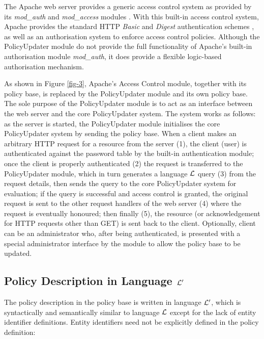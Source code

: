 \documentclass[global,twocolumn,final]{svjour}
\begin{document}

    The Apache web server provides a generic access control system as provided
    by its {\em mod\_auth} and {\em mod\_access} modules \cite{AP,LAU}. With
    this built-in access control system, Apache provides the standard HTTP
    {\em Basic} and {\em Digest} authentication schemes \cite{HTTP2}, as well
    as an authorisation system to enforce access control policies. Although the
    PolicyUpdater module do not provide the full functionality of Apache's
    built-in authorisation module {\em mod\_auth}, it does provide a flexible
    logic-based authorisation mechanism.

    As shown in Figure \ref{fig-3}, Apache's Access Control module, together
    with its policy base, is replaced by the PolicyUpdater module and its own
    policy base. The sole purpose of the PolicyUpdater module is to act as an
    interface between the web server and the core PolicyUpdater system. The
    system works as follows: as the server is started, the PolicyUpdater
    module initialises the core PolicyUpdater system by sending the policy
    base. When a client makes an arbitrary HTTP request for a resource from
    the server (1), the client (user) is authenticated against the password
    table by the built-in authentication module; once the client is properly
    authenticated (2) the request is transferred to the PolicyUpdater module,
    which in turn generates a language ${\cal L}$ query (3) from the request
    details, then sends the query to the core PolicyUpdater system for
    evaluation; if the query is successful and access control is granted,
    the original request is sent to the other request handlers of the web
    server (4) where the request is eventually honoured; then finally (5),
    the resource (or acknowledgement for HTTP requests other than GET) is sent
    back to the client. Optionally, client can be an administrator who,
    after being authenticated, is presented with a special administrator
    interface by the module to allow the policy base to be updated.

    \subsection{Policy Description in Language ${\cal L'}$}

      The policy description in the policy base is written in language
      ${\cal L'}$, which is syntactically and semantically similar to
      language ${\cal L}$ except for the lack of entity identifier
      definitions. Entity identifiers need not be explicitly defined in
      the policy definition:
\end{document}
